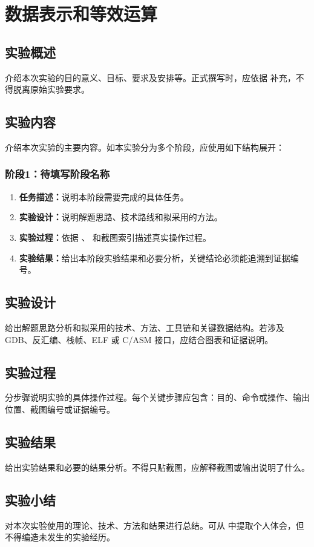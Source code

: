 \section{数据表示和等效运算}

\subsection{实验概述}

介绍本次实验的目的意义、目标、要求及安排等。正式撰写时，应依据  补充，不得脱离原始实验要求。

\subsection{实验内容}

介绍本次实验的主要内容。如本实验分为多个阶段，应使用如下结构展开：

\subsubsection{阶段1：待填写阶段名称}

\begin{enumerate}[label=\arabic*.]
    \item \textbf{任务描述：}说明本阶段需要完成的具体任务。
    \item \textbf{实验设计：}说明解题思路、技术路线和拟采用的方法。
    \item \textbf{实验过程：}依据 、 和截图索引描述真实操作过程。
    \item \textbf{实验结果：}给出本阶段实验结果和必要分析，关键结论必须能追溯到证据编号。
\end{enumerate}

\subsection{实验设计}

给出解题思路分析和拟采用的技术、方法、工具链和关键数据结构。若涉及 GDB、反汇编、栈帧、ELF 或 C/ASM 接口，应结合图表和证据说明。

\subsection{实验过程}

分步骤说明实验的具体操作过程。每个关键步骤应包含：目的、命令或操作、输出位置、截图编号或证据编号。

\subsection{实验结果}

给出实验结果和必要的结果分析。不得只贴截图，应解释截图或输出说明了什么。

\subsection{实验小结}

对本次实验使用的理论、技术、方法和结果进行总结。可从  中提取个人体会，但不得编造未发生的实验经历。
